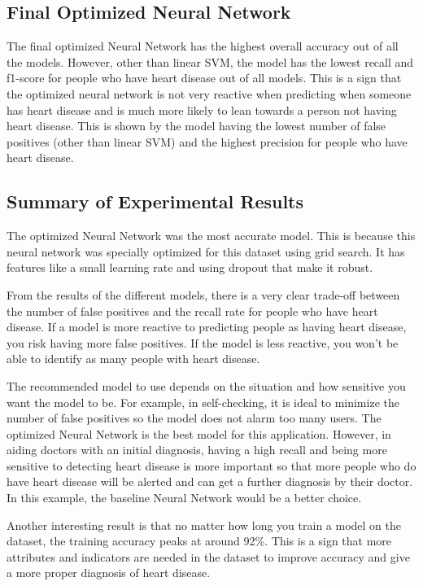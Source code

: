 \documentclass[a4paper]{article}
\begin{document}
\subsection{Final Optimized Neural Network}

The final optimized Neural Network has the highest overall accuracy out of all the models. However, other than linear SVM, the model has the lowest recall and f1-score for people who have heart disease out of all models. This is a sign that the optimized neural network is not very reactive when predicting when someone has heart disease and is much more likely to lean towards a person not having heart disease. This is shown by the model having the lowest number of false positives (other than linear SVM) and the highest precision for people who have heart disease.
	
\subsection{Summary of Experimental Results}

The optimized Neural Network was the most accurate model. This is because this neural network was specially optimized for this dataset using grid search. It has features like a small learning rate and using dropout that make it robust.

From the results of the different models, there is a very clear trade-off between the number of false positives and the recall rate for people who have heart disease. If a model is more reactive to predicting people as having heart disease, you risk having more false positives. If the model is less reactive, you won’t be able to identify as many people with heart disease.

The recommended model to use depends on the situation and how sensitive you want the model to be. For example, in self-checking, it is ideal to minimize the number of false positives so the model does not alarm too many users. The optimized Neural Network is the best model for this application. However, in aiding doctors with an initial diagnosis, having a high recall and being more sensitive to detecting heart disease is more important so that more people who do have heart disease will be alerted and can get a further diagnosis by their doctor. In this example, the baseline Neural Network would be a better choice. 

Another interesting result is that no matter how long you train a model on the dataset, the training accuracy peaks at around 92\%. This is a sign that more attributes and indicators are needed in the dataset to improve accuracy and give a more proper diagnosis of heart disease. 
\end{document}
